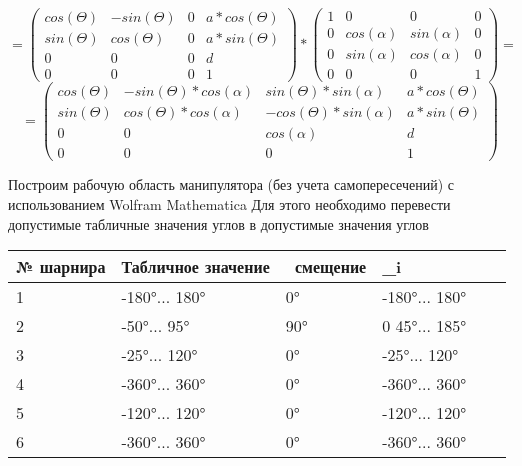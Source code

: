 \documentclass[a4paper]{article}
\begin{document}
	\begin{equation*}
		=
		\begin{pmatrix}
			cos(\Theta)&  -sin(\Theta)& 0 & a*cos(\Theta)\\
			sin(\Theta)&   cos(\Theta)& 0 &a*sin(\Theta) \\
			0& 0 & 0 &d \\
			0& 0 & 0 & 1
			
		\end{pmatrix}
		*
		\begin{pmatrix}
			1&  0&  0& 0\\
			0&  cos(\alpha) & sin(\alpha) & 0\\
			0& sin(\alpha) &   cos(\alpha)& 0\\
			0& 0 & 0 & 1
			
		\end{pmatrix}
		= 
	\end{equation*}
	\begin{equation*}
		=
		\begin{pmatrix}
			cos(\Theta)&  -sin(\Theta)*cos(\alpha)& sin(\Theta)*sin(\alpha) & a*cos(\Theta)\\
			sin(\Theta)&   cos(\Theta)*cos(\alpha)& -cos(\Theta)*sin(\alpha) &a*sin(\Theta) \\
			0& 0 & cos(\alpha) &d \\
			0& 0 & 0 & 1
			
		\end{pmatrix}
		
	\end{equation*}
	
	Построим рабочую область манипулятора (без учета самопересечений) с использованием Wolfram Mathematica
	\hfill \break
	\hfill \break
	\hfill \break
	\hfill \break
	Для этого необходимо перевести допустимые табличные значения углов в допустимые значения углов \Theta
	\hfill \break
	\hfill \break
	\begin{center}
		\begin{tabular}[c]{l|l|l|l|l|l}
			\textbf{№ шарнира} & Табличное значение & \ смещение & \Theta_i \\[2mm]\hline
			1 & -180°... 180° & 0°& -180°... 180°\\
			2 & -50°... 95° & 90°& 0 45°... 185° \\
			3 & -25°... 120° & 0°& -25°... 120°  \\
			4 & -360°... 360° & 0°& -360°... 360°  \\
			5 & -120°... 120° & 0°& -120°... 120° \\
			6 & -360°... 360° & 0°& -360°... 360° \\
		\end{tabular}
	\end{center}
	\newpage
\end{document}
